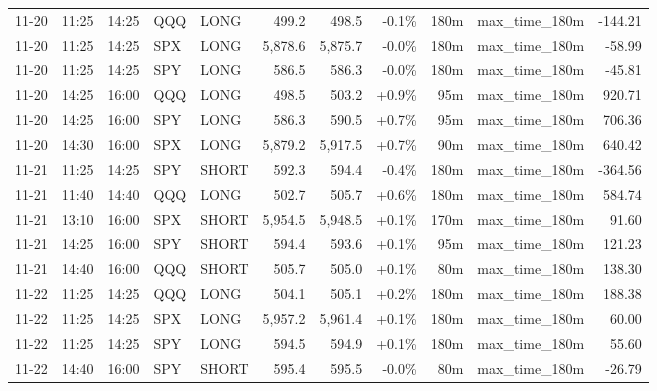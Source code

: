 \documentclass[11pt,a4paper,twoside]{article}
\begin{document}
\begin{center}
\begin{longtable}{>{\color{txtmain}}l l l l l r r r r >{\color{txtmain}}l r}
11-20 & 11:25 & 14:25 & QQQ & LONG & 499.2 & 498.5 & \textcolor{lossred}{-0.1\%} & 180m & max\_time\_180m & \textcolor{lossred}{-144.21} \\
11-20 & 11:25 & 14:25 & SPX & LONG & 5,878.6 & 5,875.7 & \textcolor{lossred}{-0.0\%} & 180m & max\_time\_180m & \textcolor{lossred}{-58.99} \\
11-20 & 11:25 & 14:25 & SPY & LONG & 586.5 & 586.3 & \textcolor{lossred}{-0.0\%} & 180m & max\_time\_180m & \textcolor{lossred}{-45.81} \\
11-20 & 14:25 & 16:00 & QQQ & LONG & 498.5 & 503.2 & \textcolor{wingreen}{+0.9\%} & 95m & max\_time\_180m & \textcolor{wingreen}{920.71} \\
11-20 & 14:25 & 16:00 & SPY & LONG & 586.3 & 590.5 & \textcolor{wingreen}{+0.7\%} & 95m & max\_time\_180m & \textcolor{wingreen}{706.36} \\
11-20 & 14:30 & 16:00 & SPX & LONG & 5,879.2 & 5,917.5 & \textcolor{wingreen}{+0.7\%} & 90m & max\_time\_180m & \textcolor{wingreen}{640.42} \\
11-21 & 11:25 & 14:25 & SPY & SHORT & 592.3 & 594.4 & \textcolor{lossred}{-0.4\%} & 180m & max\_time\_180m & \textcolor{lossred}{-364.56} \\
11-21 & 11:40 & 14:40 & QQQ & LONG & 502.7 & 505.7 & \textcolor{wingreen}{+0.6\%} & 180m & max\_time\_180m & \textcolor{wingreen}{584.74} \\
11-21 & 13:10 & 16:00 & SPX & SHORT & 5,954.5 & 5,948.5 & \textcolor{wingreen}{+0.1\%} & 170m & max\_time\_180m & \textcolor{wingreen}{91.60} \\
11-21 & 14:25 & 16:00 & SPY & SHORT & 594.4 & 593.6 & \textcolor{wingreen}{+0.1\%} & 95m & max\_time\_180m & \textcolor{wingreen}{121.23} \\
11-21 & 14:40 & 16:00 & QQQ & SHORT & 505.7 & 505.0 & \textcolor{wingreen}{+0.1\%} & 80m & max\_time\_180m & \textcolor{wingreen}{138.30} \\
11-22 & 11:25 & 14:25 & QQQ & LONG & 504.1 & 505.1 & \textcolor{wingreen}{+0.2\%} & 180m & max\_time\_180m & \textcolor{wingreen}{188.38} \\
11-22 & 11:25 & 14:25 & SPX & LONG & 5,957.2 & 5,961.4 & \textcolor{wingreen}{+0.1\%} & 180m & max\_time\_180m & \textcolor{wingreen}{60.00} \\
11-22 & 11:25 & 14:25 & SPY & LONG & 594.5 & 594.9 & \textcolor{wingreen}{+0.1\%} & 180m & max\_time\_180m & \textcolor{wingreen}{55.60} \\
11-22 & 14:40 & 16:00 & SPY & SHORT & 595.4 & 595.5 & \textcolor{lossred}{-0.0\%} & 80m & max\_time\_180m & \textcolor{lossred}{-26.79} \\

\end{longtable}
\end{center}
\end{document}
